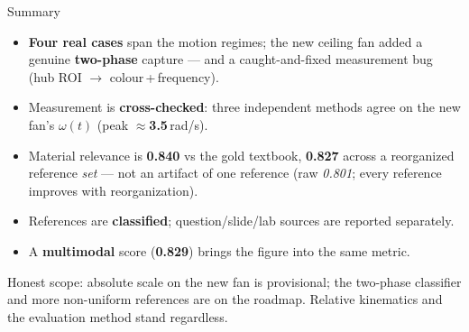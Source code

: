 \documentclass[aspectratio=169,10pt]{beamer}
\newcommand{\hl}[1]{{\bfseries\color{cAccent}#1}}
\begin{document}
\begin{frame}{Summary}
\small
\begin{itemize}\setlength\itemsep{4pt}
  \item \textbf{Four real cases} span the motion regimes; the new ceiling fan added a genuine
  \hl{two-phase} capture --- and a caught-and-fixed measurement bug (hub ROI $\to$ colour\,+\,frequency).
  \item Measurement is \textbf{cross-checked}: three independent methods agree on the new fan's
  $\omega(t)$ (peak $\approx$\hl{3.5}\,rad/s).
  \item Material relevance is \hl{0.840} vs the gold textbook, \hl{0.827} across a reorganized
  reference \emph{set} --- not an artifact of one reference (raw \emph{0.801}; every reference
  improves with reorganization).
  \item References are \textbf{classified}; question/slide/lab sources are reported separately.
  \item A \textbf{multimodal} score (\hl{0.829}) brings the figure into the same metric.
\end{itemize}
\vspace{0.4em}
{\scriptsize Honest scope: absolute scale on the new fan is provisional; the two-phase classifier
and more non-uniform references are on the roadmap. Relative kinematics and the evaluation method
stand regardless.}
\end{frame}
\end{document}
